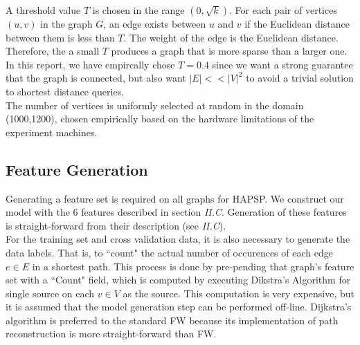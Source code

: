 \documentclass[10.5pt,journal]{IEEEtran}
\begin{document}
		A threshold value $T$ is chosen in the range $(0,\sqrt{k})$. For each pair of vertices $(u,v)$ in
		the graph $G$, an edge exists between $u$ and $v$ if the Euclidean distance between them is less
		than $T$. The weight of the edge is the Euclidean distance. Therefore, the a small $T$ produces a
		graph that is more sparse than a larger one. In this report, we have empircally chose $T=0.4$
		since we want a strong guarantee that the graph is connected, but also want $|E| << |V|^2$ to
		avoid a trivial solution to shortest distance queries.\\
		
		The number of vertices is uniformly selected at random in the domain (1000,1200), chosen empirically
		based on the hardware limitations of the experiment machines.
		
	\subsection{Feature Generation}
		Generating a feature set is required on all graphs for HAPSP. We construct our model with the 6
		features described in section {\it{II.C}}. Generation of these features is straight-forward from
		their description (see {\it{II.C}}). \\
		
		For the training set and cross validation data, it is also necessary to generate the data labels.
		That is, to ``count" the actual number of occurences of each edge $e \in E$ in a shortest path.
		This process is done by pre-pending that graph's feature set with a ``Count" field, which is
		computed by executing Dikstra's Algorithm for single source on each $v\in V$ as the source. 
		This computation is very expensive, but it is assumed that the model generation step can be
		performed off-line. Dijkstra's algorithm is preferred to the standard FW because its implementation
		of path reconstruction is more straight-forward than FW.
		
\end{document}
